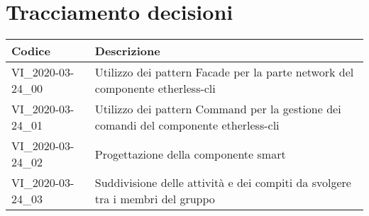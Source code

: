 \section{Tracciamento decisioni}
\renewcommand{\arraystretch}{1.8}

\begin{longtable}{|p{5cm}|p{8cm}|}
	\hline

	\rowcolor{header}
	\textbf{Codice} & \textbf{Descrizione} \\

	\hline

	VI\_2020-03-24\_00 & Utilizzo dei pattern Facade per la parte network del componente etherless-cli\\
	VI\_2020-03-24\_01 & Utilizzo dei pattern Command per la gestione dei comandi del componente etherless-cli\\
	VI\_2020-03-24\_02 & Progettazione della componente smart\\
	VI\_2020-03-24\_03 & Suddivisione delle attività e dei compiti da svolgere tra i membri del gruppo \\
	\hline
\end{longtable}
